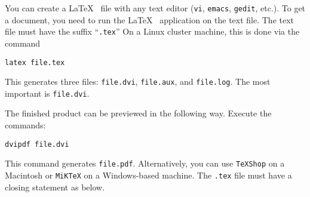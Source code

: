 \documentclass{article}
\begin{document}
\medskip
{}
\medskip

You can create a \LaTeX~ file with any text editor ({\tt vi}, {\tt emacs}, {\tt gedit}, 
etc.). 
To get a document, you need to run the \LaTeX~ application
on the text file.  The text file must have the suffix ``{\tt .tex}''
On a Linux cluster machine, this is done via the command

\medskip
{\tt latex file.tex}

\medskip
\noindent
This generates three files: {\tt file.dvi}, {\tt file.aux},
and {\tt file.log}.  The most important is {\tt file.dvi}. 

\medskip
\noindent
The finished product can be previewed in the following way.
Execute the commands:

\medskip

{\tt dvipdf file.dvi}\hspace{1.9in}{\em Linux System}

\medskip
\noindent
This command generates {\tt file.pdf}.  
Alternatively, you can use {\tt TeXShop} on a Macintosh or {\tt MiKTeX} on a Windows-based machine.
The {\tt .tex} file must have a closing statement as
below.
\end{document}
